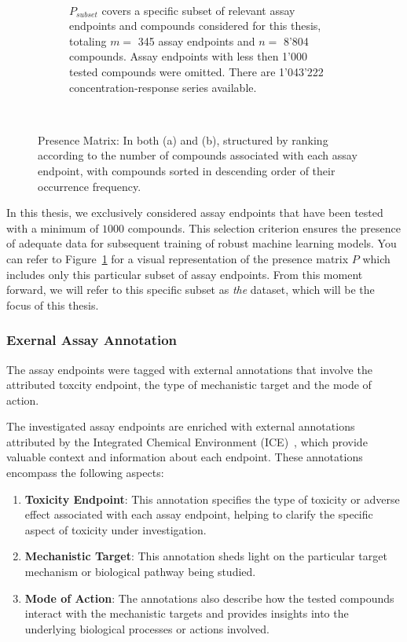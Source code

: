 \begin{figure}
\begin{subfigure}[b]{0.48\textwidth}
        \caption{$P_{subset}$ covers a specific subset of relevant assay endpoints and compounds considered for this thesis, totaling $m =$ 345 assay endpoints and $n =$ 8'804 compounds. Assay endpoints with less then 1'000 tested compounds were omitted. There are 1'043'222 concentration-response series available.}
        ~\label{fig:presence_matrix_subset}
    \end{subfigure}
    \caption{Presence Matrix: In both (a) and (b), structured by ranking according to the number of compounds associated with each assay endpoint, with compounds sorted in descending order
    of their occurrence frequency.}
    ~\label{fig:presence_matrix}
\end{figure}

In this thesis, we exclusively considered assay endpoints that have been tested with a minimum of $\num{1000}$ compounds. This selection criterion ensures the presence of adequate data for subsequent training of robust machine learning models. You can refer to Figure~\ref{fig:presence_matrix_subset} for a visual representation of the presence matrix $P$ which includes only this particular subset of assay endpoints. From this moment forward, we will refer to this specific subset as \emph{the} dataset, which will be the focus of this thesis. 

\subsubsection{Exernal Assay Annotation}
The assay endpoints were tagged with external annotations that involve the attributed toxcity endpoint, the type of mechanistic target and the mode of action.

The investigated assay endpoints are enriched with external annotations attributed by the Integrated Chemical Environment (ICE)~\cite{ice2022}, which provide valuable context and information about each endpoint. These annotations encompass the following aspects:

\begin{enumerate}
    \item \textbf{Toxicity Endpoint}: This annotation specifies the type of toxicity or adverse effect associated with each assay endpoint, helping to clarify the specific aspect of toxicity under investigation.
    
    \item \textbf{Mechanistic Target}: This annotation sheds light on the particular target mechanism or biological pathway being studied.
    
    \item \textbf{Mode of Action}: The annotations also describe how the tested compounds interact with the mechanistic targets and provides insights into the underlying biological processes or actions involved.
\end{enumerate}

